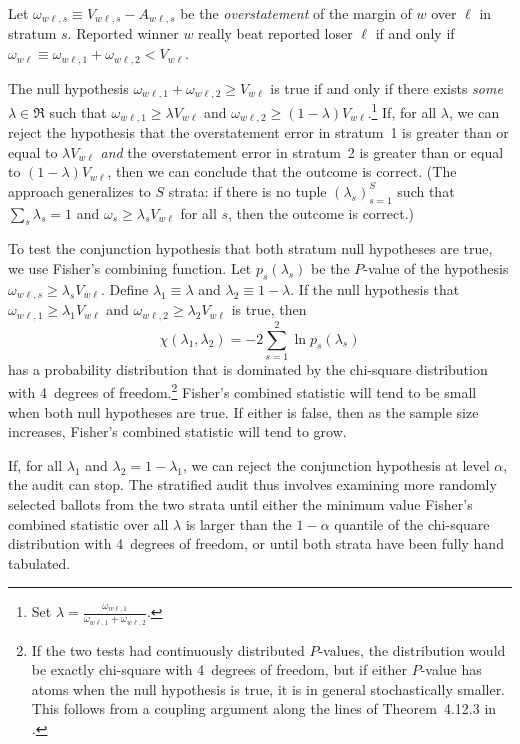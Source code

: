 \documentclass[runningheads]{llncs}
\newcommand{\beq}{\begin{equation}}
\newcommand{\eeq}{\end{equation}}
\begin{document}
Let $\omega_{w\ell,s} \equiv V_{w\ell,s} - A_{w\ell,s}$ be the \emph{overstatement}
of the margin of $w$ over $\ell$ in stratum $s$.
Reported winner $w$ really beat reported loser 
$\ell$ if and only if $\omega_{w\ell} \equiv \omega_{w\ell,1} + \omega_{w\ell,2} < V_{w\ell}$.

The null hypothesis $\omega_{w\ell, 1} + \omega_{w\ell, 2} \ge V_{w\ell}$ is true if and only if there exists \textit{some} $\lambda \in \Re$ such that 
$\omega_{w\ell, 1}\ge \lambda V_{w\ell}$ and 
$\omega_{w\ell, 2}\ge (1-\lambda) V_{w\ell}$.\footnote{%
  Set $\lambda = \frac{\omega_{w\ell, 1}}{\omega_{w\ell, 1}+\omega_{w\ell, 2}}$.
}
If, for all $\lambda$, we can reject the hypothesis that the 
overstatement error in stratum~1 is greater than or equal to $\lambda V_{w\ell}$ \emph{and} 
the overstatement error in stratum~2 is greater than or equal to $(1-\lambda) V_{w\ell}$, then
we can conclude that the outcome is correct.
(The approach generalizes to $S$ strata: if there is no tuple $( \lambda_s )_{s=1}^S$ such that
$\sum_s \lambda_s = 1$ and $\omega_s \ge \lambda_s V_{w\ell}$ for all $s$, then
the outcome is correct.)

To test the conjunction hypothesis that both stratum null hypotheses are true, we use 
Fisher's combining function.
Let $p_s(\lambda_s)$ be the $P$-value of the hypothesis $\omega_{w\ell,s} \ge \lambda_s V_{w\ell}$.
Define $\lambda_1 \equiv \lambda$ and $\lambda_2 \equiv 1-\lambda$.
If the null hypothesis that $\omega_{w\ell,1} \ge \lambda_1 V_{w\ell}$ and 
$\omega_{w\ell,2} \ge \lambda_2 V_{w\ell}$ is true, then 
\beq \label{eq:fisher}
   \chi(\lambda_1, \lambda_2) = -2 \sum_{s=1}^2 \ln p_s(\lambda_s)
\eeq
has a probability distribution that is dominated by the chi-square distribution with 4~degrees
of freedom.\footnote{%
   If the two tests had continuously distributed $P$-values, the distribution would be exactly
   chi-square with 4~degrees of freedom, but if either $P$-value has atoms when
   the null hypothesis is true, it is in general stochastically smaller.
   This follows from a coupling argument along the lines of Theorem~4.12.3 in \cite{grimmett01}.
}
Fisher's combined statistic will tend to be small when both null hypotheses are true.
If either is false, then as the sample size increases, Fisher's combined statistic will tend to grow.

If, for all $\lambda_1$ and $\lambda_2 = 1- \lambda_1$, we can reject the conjunction
hypothesis at level $\alpha$, the audit can stop.
The stratified audit thus involves examining more randomly selected ballots from the two strata until 
either the minimum value Fisher's combined statistic over all $\lambda$ 
is larger than the $1-\alpha$ quantile of the chi-square
distribution with 4~degrees of freedom, or until both strata have been fully hand tabulated.
\end{document}
